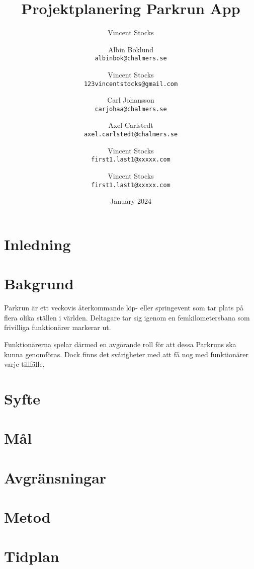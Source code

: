 \documentclass{article}
\title{Projektplanering Parkrun App}
\author{Vincent Stocks}
\author{
    Albin Boklund\\
    \texttt{albinbok@chalmers.se}
    \and
    Vincent Stocks\\
    \texttt{123vincentstocks@gmail.com}
    \and
    Carl Johansson\\
    \texttt{carjohaa@chalmers.se}
    \and
    Axel Carlstedt\\
    \texttt{axel.carlstedt@chalmers.se}
    \and
    Vincent Stocks\\
    \texttt{first1.last1@xxxxx.com}
    \and
    Vincent Stocks\\
    \texttt{first1.last1@xxxxx.com}
}
\date{January 2024}
\begin{document}
\maketitle

\newpage
\tableofcontents
\newpage
\section{Inledning}

\section{Bakgrund}
Parkrun är ett veckovis återkommande löp- eller springevent som tar plats på flera olika ställen i världen. Deltagare tar sig igenom en femkilometersbana som frivilliga funktionärer markerar ut.

Funktionärerna spelar därmed en avgörande roll för att dessa Parkruns ska kunna genomföras. Dock finns det svårigheter med att få nog med funktionärer varje tillfälle, 
\section{Syfte}

\section{Mål}

\section{Avgränsningar}

\section{Metod}

\section{Tidplan}
\end{document}
